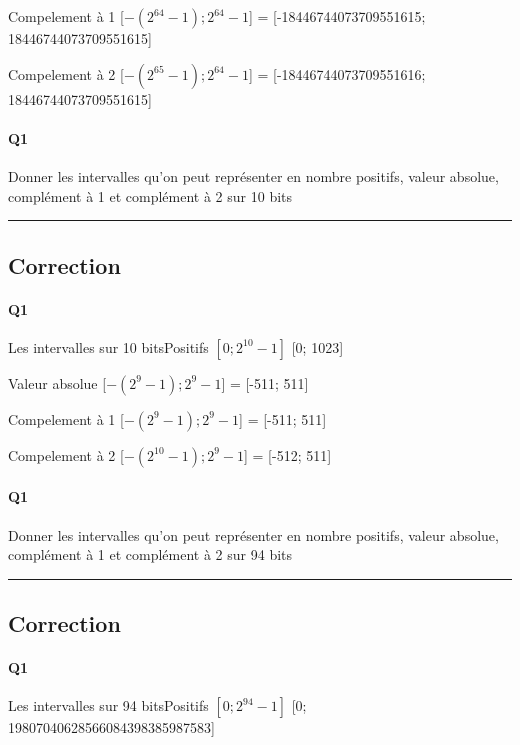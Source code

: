 Compelement à 1 [$-(2^{64}-1);2^{64}-1$] = [-18446744073709551615; 18446744073709551615]

Compelement à 2 [$-(2^{65}-1);2^{64}-1$] = [-18446744073709551616; 18446744073709551615]
\pagebreak

\paragraph{Q1}

Donner les intervalles qu'on peut représenter en nombre positifs, valeur absolue, complément à 1 et complément à 2  sur 10 bits



\hrule width 1\linewidth
\pagebreak

\subsection{Correction}


\paragraph{Q1}

Les intervalles sur 10 bitsPositifs $[0; 2^{10}-1]$ [0; 1023]

Valeur absolue [$-(2^{9}-1);2^{9}-1$] = [-511; 511]

Compelement à 1 [$-(2^{9}-1);2^{9}-1$] = [-511; 511]

Compelement à 2 [$-(2^{10}-1);2^{9}-1$] = [-512; 511]
\pagebreak

\paragraph{Q1}

Donner les intervalles qu'on peut représenter en nombre positifs, valeur absolue, complément à 1 et complément à 2  sur 94 bits



\hrule width 1\linewidth
\pagebreak

\subsection{Correction}


\paragraph{Q1}

Les intervalles sur 94 bitsPositifs $[0; 2^{94}-1]$ [0; 19807040628566084398385987583]

